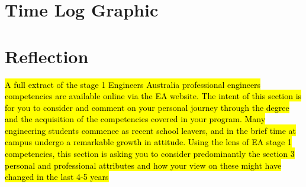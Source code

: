 \documentclass{UoNMCHA}
\numberwithin{equation}{section}
\begin{document}
\newpage
\appendix
\captionsetup[figure]{list=no}
\section{Time Log Graphic}

\newpage
\section{Reflection}
    \hl{A full extract of the stage 1 Engineers Australia professional engineers competencies are available online via the EA website. The intent of this section is for you to consider and comment on your personal journey through the degree and the acquisition of the competencies covered in your program.  Many engineering students commence as recent school leavers, and in the brief time at campus undergo a remarkable growth in attitude.  Using the lens of EA stage 1 competencies, this section is asking you to consider predominantly the section 3 personal and professional attributes and how your view on these might have changed in the last 4-5 years}
    
\newpage
\end{document}
